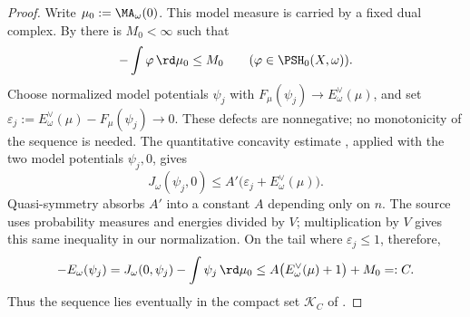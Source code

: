\begin{proof}
Write $\mu_0:=\MA_\omega(0)$.  This model measure is carried by a fixed
dual complex.  By  there is $M_0<\infty$
such that
\[
             -\int\varphi\,\rd\mu_0\leq M_0
             \qquad(\varphi\in\PSH_0(X,\omega)).
\]
Choose normalized model potentials $\psi_j$ with
$F_\mu(\psi_j)\to E_\omega^\vee(\mu)$, and set
$\varepsilon_j:=E_\omega^\vee(\mu)-F_\mu(\psi_j)\to0$.
These defects are nonnegative; no monotonicity of the sequence is needed.
The quantitative concavity estimate
\cite[Proposition~2.2, equation~(2.7)]{BJ25FiniteEnergy}, applied with
the two model potentials $\psi_j,0$, gives
\[
 J_\omega(\psi_j,0)
 \leq A'\bigl(\varepsilon_j+E_\omega^\vee(\mu)\bigr).
\]
Quasi-symmetry absorbs $A'$ into a constant $A$ depending only on $n$.
The source uses probability measures and energies divided by $V$;
multiplication by $V$ gives this same inequality in our normalization.
On the tail where $\varepsilon_j\leq1$, therefore,
\begin{equation}
\label{eq:ch28-general-energy-bound}
 -E_\omega(\psi_j)
 =J_\omega(0,\psi_j)-\int\psi_j\,\rd\mu_0
 \leq A\bigl(E_\omega^\vee(\mu)+1\bigr)+M_0=:C.
\end{equation}
Thus the sequence lies eventually in the compact set $\mathcal K_C$
of .


\end{proof}
